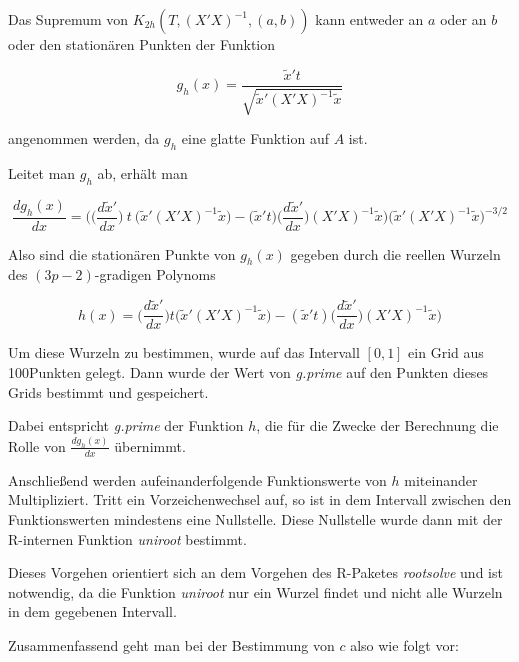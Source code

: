 \documentclass[12pt,a4paper]{article}
\theoremstyle{definition}
\theoremstyle{definition}
\theoremstyle{definition}
\theoremstyle{definition}
\newcommand{\ngridpoly}{100}
\begin{document}
Das Supremum von $K_{2h}(T,(X'X)^{-1},(a,b))$ kann entweder an $a$ oder an $b$ oder den stationären Punkten der Funktion

\begin{equation*}
g_h(x) = \frac{\tilde{x}'t}{\sqrt{\tilde{x}'(X'X)^{-1}\tilde{x}}}
\end{equation*}

angenommen werden, da $g_h$ eine glatte Funktion auf $A$ ist.

Leitet man $g_h$ ab, erhält man

\begin{equation*}
\frac{d g_h(x)}{dx} = \bigg ( \big ( \frac{d\tilde{x}'}{dx} \big) ~ t ~ \big ( \tilde{x}'(X'X)^{-1}\tilde{x} \big ) - \big ( \tilde{x}'t \big ) \big ( \frac{d\tilde{x}'}{dx} \big ) (X'X)^{-1} \tilde{x} \bigg ) \bigg ( \tilde{x}'(X'X)^{-1}\tilde{x} \bigg )^{-3/2}
\end{equation*}

Also sind die stationären Punkte von $g_h(x)$ gegeben durch die reellen Wurzeln des $(3p-2)$-gradigen Polynoms

\begin{equation*}
h(x) = \big(\frac{d\tilde{x}'}{dx}\big) t \big( \tilde{x}'(X'X)^{-1}\tilde{x} \big) - (\tilde{x}'t) \big(\frac{d\tilde{x}'}{dx}\big) (X'X)^{-1} \tilde{x})
\end{equation*}

Um diese Wurzeln zu bestimmen, wurde auf das Intervall $[0,1]$ ein Grid aus \ngridpoly Punkten gelegt. Dann wurde der Wert von \textit{g.prime} auf den Punkten dieses Grids bestimmt und gespeichert. 

Dabei entspricht \textit{g.prime} der Funktion $h$, die für die Zwecke der Berechnung die Rolle von $\frac{d g_h(x)}{dx}$ übernimmt.

Anschließend werden aufeinanderfolgende Funktionswerte von $h$ miteinander Multipliziert. Tritt ein Vorzeichenwechsel auf, so ist in dem Intervall zwischen den Funktionswerten mindestens eine Nullstelle. Diese Nullstelle wurde dann mit der R-internen Funktion \textit{uniroot} bestimmt.

Dieses Vorgehen orientiert sich an dem Vorgehen des R-Paketes \textit{rootsolve} und ist notwendig, da die Funktion \textit{uniroot} nur ein Wurzel findet und nicht alle Wurzeln in dem gegebenen Intervall.

Zusammenfassend geht man bei der Bestimmung von $c$ also wie folgt vor:
\end{document}

